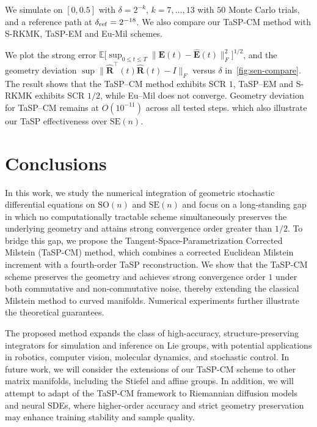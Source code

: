 \documentclass[11pt, a4paper, onecolumn]{article}
\newcommand{\SEn}{\mathrm{SE}(n)}
\newcommand{\E}{\mathbb{E}}
\newcommand{\bfE}{\bf{E}}
\newcommand{\bfR}{\mathbf{R}}
\renewcommand{\bf}[1]{\mathbf{#1}}
\begin{document}
We simulate on $[0,0.5]$ with $\delta=2^{-k}$, $k=7,\dots,13$ with $50$ Monte Carlo trials, and a reference path at $\delta_{\rm ref}=2^{-18}$. We also compare our TaSP-CM method with S-RKMK, TaSP-EM and Eu-Mil schemes. 


We plot the strong error $\E\big[\sup_{0\le t\le T}\|\bfE(t)-\widehat{\bfE}(t)\|_F^2\big]^{1/2}$, and the geometry deviation $\sup\|\widehat{\bfR}^\top(t)\widehat{\bfR}(t)-I\|_F$ versus $\delta$ in~\cref{fig:sen-compare}. The result shows that the TaSP–CM method exhibits SCR $1$, TaSP–EM and S-RKMK exhibits SCR $1/2$, while Eu–Mil does not converge. Geometry deviation for TaSP–CM remains at $O(10^{-11})$ across all tested steps. which also illustrate our TaSP effectiveness over $\SEn$.



\section{Conclusions}\label{sec:conclusions}
In this work, we study the numerical integration of geometric stochastic differential equations on $\mathrm{SO}(n)$ and $\mathrm{SE}(n)$ and focus on a long-standing gap in which no computationally tractable scheme simultaneously preserves the underlying geometry and attains strong convergence order greater than $1/2$. To bridge this gap, we propose the Tangent-Space-Parametrization Corrected Milstein (TaSP-CM) method, which combines a corrected Euclidean Milstein increment with a fourth-order TaSP reconstruction. We show that the TaSP-CM scheme preserves the geometry and achieves strong convergence order $1$ under both commutative and non-commutative noise, thereby extending the classical Milstein method to curved manifolds. Numerical experiments further illustrate the theoretical guarantees.

The proposed method expands the class of high-accuracy, structure-preserving integrators for simulation and inference on Lie groups, with potential applications in robotics, computer vision, molecular dynamics, and stochastic control. In future work, we will consider the extensions of our TaSP-CM scheme to other matrix manifolds, including the Stiefel and affine groups. In addition, we will attempt to adapt of the TaSP-CM framework to Riemannian diffusion models and neural SDEs, where higher-order accuracy and strict geometry preservation may enhance training stability and sample quality.
\end{document}
